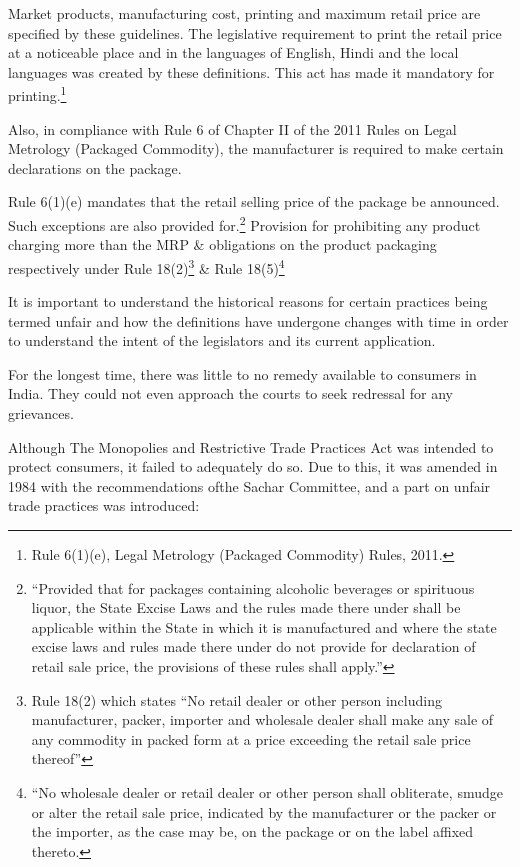 \begin{multicols}{2}
\vspace{-.1cm}

\noi
Market products, manufacturing cost, printing and maximum retail price are specified by these
guidelines. The legislative requirement to print the retail price at a noticeable place and in the
languages of English, Hindi and the local languages was created by these definitions. This act
has made it mandatory for printing.\footnote{Rule 6(1)(e), Legal Metrology (Packaged Commodity) Rules, 2011.}

\noi
Also, in compliance with Rule 6 of Chapter II of the 2011 Rules on Legal Metrology (Packaged
Commodity), the manufacturer is required to make certain declarations on the package.

\noi
Rule 6(1)(e) mandates that the retail selling price of the package be announced. Such
exceptions are also provided for.\footnote{“Provided that for packages containing alcoholic beverages or spirituous liquor, the State Excise Laws and the rules made there under shall be applicable within the State in which it is manufactured and where the state excise laws and rules made there under do not provide for declaration of retail sale price, the provisions of these rules shall apply.”} Provision for prohibiting any product charging more than the MRP \& obligations on the product packaging respectively under Rule 18(2)\footnote{Rule 18(2) which states “No retail dealer or other person including manufacturer, packer, importer and wholesale dealer shall make any sale of any commodity in packed form at a price exceeding the retail sale price thereof”} \& Rule 18(5)\footnote{“No wholesale dealer or retail dealer or other person shall obliterate, smudge or alter the retail sale price, indicated by the manufacturer or the packer or the importer, as the case may be, on the package or on the label affixed thereto.}


\noi
It is important to understand the historical reasons for certain practices being termed unfair and
how the definitions have undergone changes with time in order to understand the intent of the
legislators and its current application.

\noi
For the longest time, there was little to no remedy available to consumers in India. They could
not even approach the courts to seek redressal for any grievances.

\noi
Although The Monopolies and Restrictive Trade Practices Act was intended to protect
consumers, it failed to adequately do so. Due to this, it was amended in 1984 with the
recommendations ofthe Sachar Committee, and a part on unfair trade practices was introduced:


\end{multicols}
